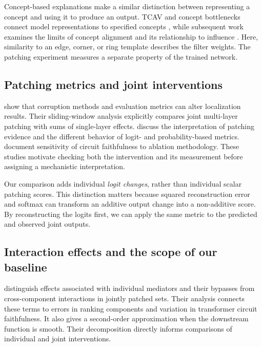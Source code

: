 \documentclass[pdflatex,sn-basic]{sn-jnl}
\begin{document}
Concept-based explanations make a similar distinction between representing a concept and using it to produce an output. TCAV and concept bottlenecks connect model representations to specified concepts \citep{kim_2018_tcav,koh_2020_concept-bottlenecks}, while subsequent work examines the limits of concept alignment and its relationship to influence \citep{margeloiu_2021_concept-bottleneck-alignment,nicolson_2025_explaining-explainability,sharma_2026_encoding-without-influence}. Here, similarity to an edge, corner, or ring template describes the filter weights. The patching experiment measures a separate property of the trained network.

\subsection{Patching metrics and joint interventions}

\citet{zhang_2024_activation-patching} show that corruption methods and evaluation metrics can alter localization results. Their sliding-window analysis explicitly compares joint multi-layer patching with sums of single-layer effects. \citet{heimersheim_2024_activation-patching} discuss the interpretation of patching evidence and the different behavior of logit- and probability-based metrics. \citet{miller_2024_circuit-faithfulness} document sensitivity of circuit faithfulness to ablation methodology. These studies motivate checking both the intervention and its measurement before assigning a mechanistic interpretation.

Our comparison adds individual \emph{logit changes}, rather than individual scalar patching scores. This distinction matters because squared reconstruction error and softmax can transform an additive output change into a non-additive score. By reconstructing the logits first, we can apply the same metric to the predicted and observed joint outputs.

\subsection{Interaction effects and the scope of our baseline}

\citet{vaidyanathan_2026_multiple-mediators} distinguish effects associated with individual mediators and their bypasses from cross-component interactions in jointly patched sets. Their analysis connects these terms to errors in ranking components and variation in transformer circuit faithfulness. It also gives a second-order approximation when the downstream function is smooth. Their decomposition directly informs comparisons of individual and joint interventions.
\end{document}
